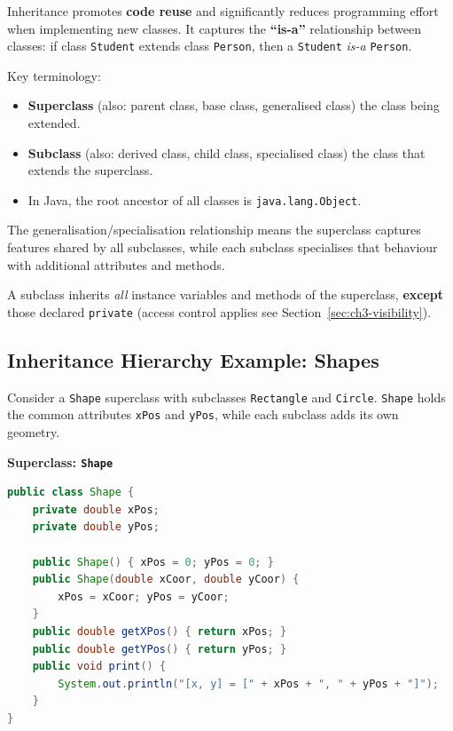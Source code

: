 \documentclass[11pt, a4paper, notitlepage]{report}
\theoremstyle{definition}
\theoremstyle{remark}
\theoremstyle{definition}
\begin{document}
Inheritance promotes \textbf{code reuse} and significantly reduces programming effort when implementing new classes. It captures the \textbf{``is-a''} relationship between classes: if class \texttt{Student} extends class \texttt{Person}, then a \texttt{Student} \emph{is-a} \texttt{Person}.

Key terminology:
\begin{itemize}
    \item \textbf{Superclass} (also: parent class, base class, generalised class)  the class being extended.
    \item \textbf{Subclass} (also: derived class, child class, specialised class)  the class that extends the superclass.
    \item In Java, the root ancestor of all classes is \texttt{java.lang.Object}.
\end{itemize}

The generalisation/specialisation relationship means the superclass captures features shared by all subclasses, while each subclass specialises that behaviour with additional attributes and methods.

\begin{keyresult}[title={Key Result: What a Subclass Inherits}]
A subclass inherits \emph{all} instance variables and methods of the superclass, \textbf{except} those declared \texttt{private} (access control applies  see Section~\ref{sec:ch3-visibility}).
\end{keyresult}

\subsection{Inheritance Hierarchy Example: Shapes}
\label{sec:ch3-shapes}

Consider a \texttt{Shape} superclass with subclasses \texttt{Rectangle} and \texttt{Circle}. \texttt{Shape} holds the common attributes \texttt{xPos} and \texttt{yPos}, while each subclass adds its own geometry.

\textbf{Superclass: \texttt{Shape}}
\begin{lstlisting}[language=Java]
public class Shape {
    private double xPos;
    private double yPos;

    public Shape() { xPos = 0; yPos = 0; }
    public Shape(double xCoor, double yCoor) {
        xPos = xCoor; yPos = yCoor;
    }
    public double getXPos() { return xPos; }
    public double getYPos() { return yPos; }
    public void print() {
        System.out.println("[x, y] = [" + xPos + ", " + yPos + "]");
    }
}
\end{lstlisting}
\end{document}
